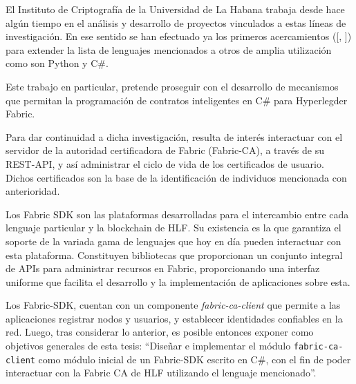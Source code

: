 El Instituto de Criptograf\'ia de la Universidad de La Habana trabaja desde hace alg\'un tiempo en el an\'alisis y desarrollo de proyectos vinculados a estas l\'ineas de investigaci\'on. En ese sentido se han efectuado ya los primeros acercamientos ([\cite{chaincode22python}, \cite{chaincode22csharp}]) para extender la lista de lenguajes mencionados a otros de amplia utilizaci\'on como son Python y C\#.

Este trabajo en particular, pretende proseguir con el desarrollo de mecanismos que permitan la programaci\'on de contratos inteligentes en C\# para Hyperlegder Fabric.

Para dar continuidad a dicha investigaci\'on, resulta de inter\'es interactuar con el servidor de la autoridad certificadora de Fabric (Fabric-CA), a trav\'es de su REST-API, y as\'i administrar el ciclo de vida de los certificados de usuario. Dichos certificados son la base de la identificaci\'on de individuos mencionada con anterioridad. 

Los Fabric SDK son las plataformas desarrolladas para el intercambio entre cada lenguaje particular y la blockchain de HLF. Su existencia es la que garantiza el soporte de la variada gama de lenguajes que hoy en d\'ia pueden interactuar con esta plataforma. Constituyen bibliotecas que proporcionan un conjunto integral de APIs para administrar recursos en Fabric, proporcionando una interfaz uniforme que facilita el desarrollo y la implementación de aplicaciones sobre esta. 

Los Fabric-SDK, cuentan con un componente \emph{fabric-ca-client} que permite a las aplicaciones registrar nodos y usuarios, y establecer identidades confiables en la red. Luego, tras considerar lo anterior, es posible entonces exponer como objetivos
generales de esta tesis: “Diseñar e implementar el m\'odulo \texttt{fabric-ca-client} como m\'odulo inicial de un Fabric-SDK escrito en C\#, con el fin de poder interactuar con la Fabric CA de HLF utilizando el lenguaje mencionado”.


